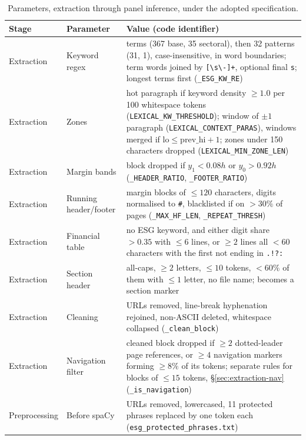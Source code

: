\begin{table}[p]
\centering
\footnotesize
\caption{Parameters, extraction through panel inference, under the adopted
specification.}
\label{tab:repro-params}
\setlength{\tabcolsep}{4pt}
\begin{tabular}{@{}>{\raggedright\arraybackslash}p{2.05cm}>{\raggedright\arraybackslash}p{3.0cm}>{\raggedright\arraybackslash}p{10.25cm}@{}}
\toprule
Stage & Parameter & Value (code identifier) \\
\midrule
Extraction & Keyword regex & 402 terms (367 base, 35 sectoral), then 32 patterns (31, 1), case-insensitive, in word boundaries; term words joined by \verb|[\s\-]+|, optional final \texttt{s}; longest terms first (\texttt{\_ESG\_KW\_RE}) \\
Extraction & Zones & hot paragraph if keyword density $\geq 1.0$ per 100 whitespace tokens (\texttt{LEXICAL\_KW\_THRESHOLD}); window of $\pm1$ paragraph (\texttt{LEXICAL\_CONTEXT\_PARAS}), windows merged if $\mathrm{lo} \leq \mathrm{prev\_hi}+1$; zones under 150 characters dropped (\texttt{LEXICAL\_MIN\_ZONE\_LEN}) \\
Extraction & Margin bands & block dropped if $y_1 < 0.08h$ or $y_0 > 0.92h$ (\texttt{\_HEADER\_RATIO}, \texttt{\_FOOTER\_RATIO}) \\
Extraction & Running header/footer & margin blocks of $\leq120$ characters, digits normalised to \texttt{\#}, blacklisted if on $>30\%$ of pages (\texttt{\_MAX\_HF\_LEN}, \texttt{\_REPEAT\_THRESH}) \\
Extraction & Financial table & no ESG keyword, and either digit share $>0.35$ with $\leq6$ lines, or $\geq2$ lines all $<60$ characters with the first not ending in \texttt{.!?:} \\
Extraction & Section header & all-caps, $\geq2$ letters, $\leq10$ tokens, $<60\%$ of them with $\leq1$ letter, no file name; becomes a section marker \\
Extraction & Cleaning & URLs removed, line-break hyphenation rejoined, non-ASCII deleted, whitespace collapsed (\texttt{\_clean\_block}) \\
Extraction & Navigation filter & cleaned block dropped if $\geq2$ dotted-leader page references, or $\geq4$ navigation markers forming $\geq8\%$ of its tokens; separate rules for blocks of $\leq15$ tokens, \S\ref{sec:extraction-nav} (\texttt{\_is\_navigation}) \\
\midrule
Preprocessing & Before spaCy & URLs removed, lowercased, 11 protected phrases replaced by one token each (\nolinkurl{esg_protected_phrases.txt}) \\

\end{tabular}
\end{table}
